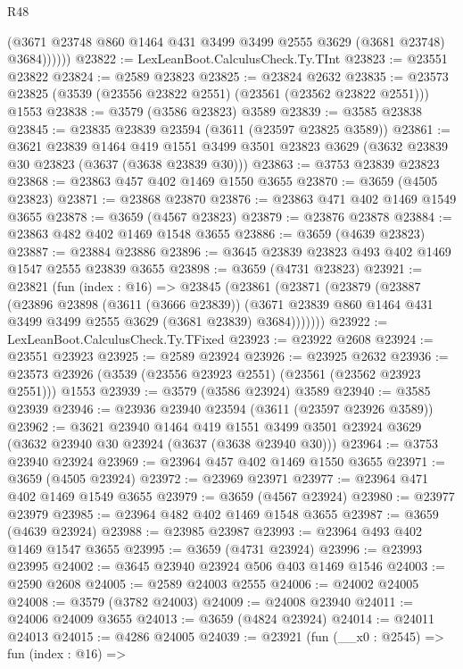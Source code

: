 \begin{lexlean}{R48}
\begin{coremodule}
              (@3671 @23748 @860 @1464 @431 @3499 @3499 @2555 @3629 (@3681 @23748) @3684))))))
@23822 := LexLeanBoot.CalculusCheck.Ty.TInt
@23823 := @23551 @23822
@23824 := @2589 @23823
@23825 := @23824 @2632
@23835 := @23573 @23825 (@3539 (@23556 @23822 @2551) (@23561 (@23562 @23822 @2551))) @1553
@23838 := @3579 (@3586 @23823) @3589
@23839 := @3585 @23838
@23845 := @23835 @23839 @23594 (@3611 (@23597 @23825 @3589))
@23861 := @3621
    @23839
    @1464
    @419
    @1551
    @3499
    @3501
    @23823
    @3629
    (@3632 @23839 @30 @23823 (@3637 (@3638 @23839 @30)))
@23863 := @3753 @23839 @23823
@23868 := @23863 @457 @402 @1469 @1550 @3655
@23870 := @3659 (@4505 @23823)
@23871 := @23868 @23870
@23876 := @23863 @471 @402 @1469 @1549 @3655
@23878 := @3659 (@4567 @23823)
@23879 := @23876 @23878
@23884 := @23863 @482 @402 @1469 @1548 @3655
@23886 := @3659 (@4639 @23823)
@23887 := @23884 @23886
@23896 := @3645 @23839 @23823 @493 @402 @1469 @1547 @2555 @23839 @3655
@23898 := @3659 (@4731 @23823)
@23921 := @23821
    (fun (index : @16) =>
    @23845
      (@23861
        (@23871
          (@23879
            (@23887
              (@23896
                @23898
                (@3611 (@3666 @23839))
                (@3671 @23839 @860 @1464 @431 @3499 @3499 @2555 @3629 (@3681 @23839) @3684)))))))
@23922 := LexLeanBoot.CalculusCheck.Ty.TFixed
@23923 := @23922 @2608
@23924 := @23551 @23923
@23925 := @2589 @23924
@23926 := @23925 @2632
@23936 := @23573 @23926 (@3539 (@23556 @23923 @2551) (@23561 (@23562 @23923 @2551))) @1553
@23939 := @3579 (@3586 @23924) @3589
@23940 := @3585 @23939
@23946 := @23936 @23940 @23594 (@3611 (@23597 @23926 @3589))
@23962 := @3621
    @23940
    @1464
    @419
    @1551
    @3499
    @3501
    @23924
    @3629
    (@3632 @23940 @30 @23924 (@3637 (@3638 @23940 @30)))
@23964 := @3753 @23940 @23924
@23969 := @23964 @457 @402 @1469 @1550 @3655
@23971 := @3659 (@4505 @23924)
@23972 := @23969 @23971
@23977 := @23964 @471 @402 @1469 @1549 @3655
@23979 := @3659 (@4567 @23924)
@23980 := @23977 @23979
@23985 := @23964 @482 @402 @1469 @1548 @3655
@23987 := @3659 (@4639 @23924)
@23988 := @23985 @23987
@23993 := @23964 @493 @402 @1469 @1547 @3655
@23995 := @3659 (@4731 @23924)
@23996 := @23993 @23995
@24002 := @3645 @23940 @23924 @506 @403 @1469 @1546
@24003 := @2590 @2608
@24005 := @2589 @24003 @2555
@24006 := @24002 @24005
@24008 := @3579 (@3782 @24003)
@24009 := @24008 @23940
@24011 := @24006 @24009 @3655
@24013 := @3659 (@4824 @23924)
@24014 := @24011 @24013
@24015 := @4286 @24005
@24039 := @23921
    (fun (__x0 : @2545) =>
    fun (index : @16) =>

\end{coremodule}
\end{lexlean}
